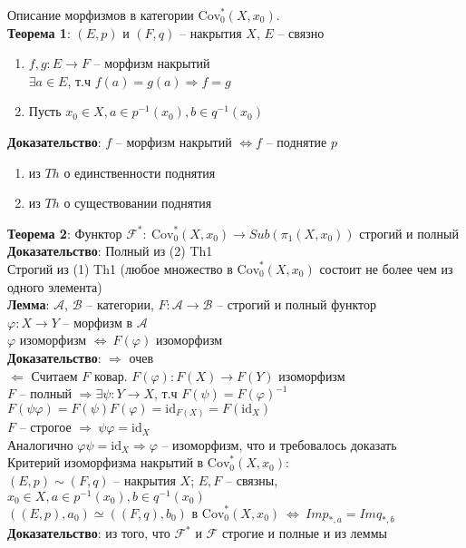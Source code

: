 	Описание морфизмов в категории $\text{Cov}_0^{*} (X,x_0)$.\\
	\textbf{Теорема 1}: $(E, p)$ и $(F,q)$ -- накрытия $X$, $E$ -- связно
	\begin{enumerate}
	\item $f, g: E \rightarrow F$ -- морфизм накрытий\\
		$\exists a \in E$, т.ч $f(a) = g(a) \Rightarrow f = g$
	\item Пусть $x_0 \in X, a\in p^{-1} (x_0), b\in q^{-1} (x_0)$
	\end{enumerate}
	\textbf{Доказательство}: $f$ -- морфизм накрытий $\Leftrightarrow f$ -- поднятие $p$
	\begin{enumerate}
	\item из $Th$ о единственности поднятия
	\item из $Th$ о существовании поднятия
	\end{enumerate}
	\textbf{Теорема 2}: Функтор $\mathcal{F}^{*}: \ \text{Cov}_0^{*}(X, x_0)\rightarrow Sub({\pi}_1(X, x_0))$ строгий и полный\\
	\textbf{Доказательство}: Полный из (2) Th1\\
	Строгий из (1) Th1 (любое множество в $\text{Cov}_0^{*}(X, x_0)$ состоит не более чем из одного элемента)\\
	\textbf{Лемма}: $\mathcal{A}$, $\mathcal{B}$ -- категории, $F: \mathcal{A}\rightarrow\mathcal{B}$ -- строгий и полный функтор\\
	$\varphi: X \rightarrow Y$ -- морфизм в $\mathcal{A}$\\
	$\varphi$ изоморфизм $\Leftrightarrow\ F(\varphi)$ изоморфизм\\
	\textbf{Доказательство}: $\Rightarrow$ очев\\
	$\Leftarrow$ Считаем $F$ ковар. $F(\varphi): F(X) \rightarrow F(Y)$ изоморфизм\\
	$F$ -- полный $\Rightarrow \exists \psi: Y\rightarrow X $, т.ч $F(\psi) = F(\varphi)^{-1}$\\
	$F(\psi \varphi) = F(\psi) F(\varphi) =  \text{id}_{F(X)} = F( \text{id}_X)$\\
	$F$ -- строгое $\Rightarrow\ \psi \varphi =  \text{id}_X$\\
	Аналогично $\varphi \psi =  \text{id}_X \Rightarrow \varphi$ -- изоморфизм, что и требовалось доказать\\
	Критерий изоморфизма накрытий в $\text{Cov}_0^{*}(X, x_0)$:\\
	$(E,p)\sim (F,q)$ -- накрытия $X$; $E,F$ -- связны, $x_0 \in X, a \in p^{-1}(x_0), b \in q^{-1}(x_0)$\\
	$((E, p), a_0) \simeq ((F,q), b_0)$ в $\text{Cov}_0^{*}(X, x_0)\ \Leftrightarrow\ Im p_{*,a} = Im q_{*,b}$\\
	\textbf{Доказательство}: из того, что $\mathcal{F}^{*}$ и $\mathcal{F}$ строгие и полные и из леммы\\
	


